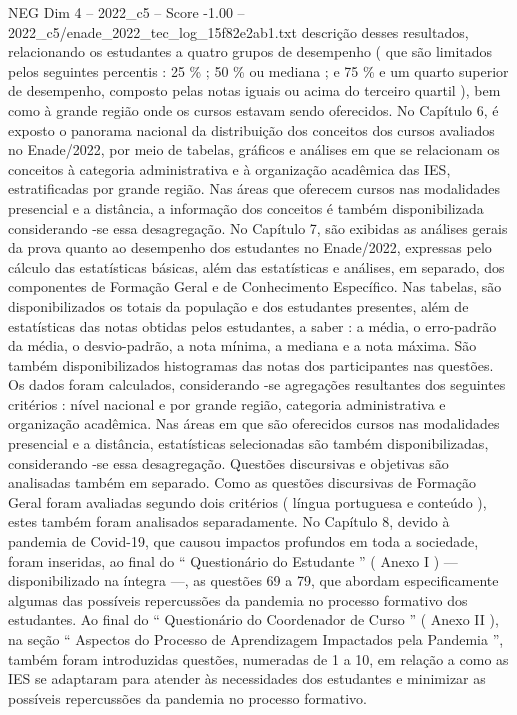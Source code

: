 \begin{textsample}{NEG Dim 4 – 2022\_c5 – Score -1.00 – 2022\_c5/enade\_2022\_tec\_log\_15f82e2ab1.txt}  \label{ex:f4_neg_079}
descrição desses resultados, relacionando os estudantes a quatro grupos de desempenho ( que são limitados pelos seguintes percentis : 25 \% ; 50 \% ou mediana ; e 75 \% e um quarto superior de desempenho, composto pelas notas iguais ou acima do terceiro quartil ), bem como à grande região onde os cursos estavam sendo oferecidos.
No Capítulo 6, é exposto o panorama nacional da distribuição dos conceitos dos cursos avaliados no Enade/2022, por meio de tabelas, gráficos e análises em que se relacionam os conceitos à categoria administrativa e à organização acadêmica das IES, estratificadas por grande região.
Nas áreas que oferecem cursos nas modalidades presencial e a distância, a informação dos conceitos é também disponibilizada considerando -se essa desagregação.
No Capítulo 7, são exibidas as análises gerais da prova quanto ao desempenho dos estudantes no Enade/2022, expressas pelo cálculo das estatísticas básicas, além das estatísticas e análises, em separado, dos componentes de Formação Geral e de Conhecimento Específico.
Nas tabelas, são disponibilizados os totais da população e dos estudantes presentes, além de estatísticas das notas obtidas pelos estudantes, a saber : a média, o erro-padrão da média, o desvio-padrão, a nota mínima, a mediana e a nota máxima.
São também disponibilizados histogramas das notas dos participantes nas questões.
Os dados foram calculados, considerando -se agregações resultantes dos seguintes critérios : nível nacional e por grande região, categoria administrativa e organização acadêmica.
Nas áreas em que são oferecidos cursos nas modalidades presencial e a distância, estatísticas selecionadas são também disponibilizadas, considerando -se essa desagregação.
Questões discursivas e objetivas são analisadas também em separado.
Como as questões discursivas de Formação Geral foram avaliadas segundo dois critérios ( língua portuguesa e conteúdo ), estes também foram analisados separadamente.
No Capítulo 8, devido à pandemia de Covid-19, que causou impactos profundos em toda a sociedade, foram inseridas, ao final do “ Questionário do Estudante ” ( Anexo I ) — disponibilizado na íntegra —, as questões 69 a 79, que abordam especificamente algumas das possíveis repercussões da pandemia no processo formativo dos estudantes.
Ao final do “ Questionário do Coordenador de Curso ” ( Anexo II ), na seção “ Aspectos do Processo de Aprendizagem Impactados pela Pandemia ”, também foram introduzidas questões, numeradas de 1 a 10, em relação a como as IES se adaptaram para atender às necessidades dos estudantes e minimizar as possíveis repercussões da pandemia no processo formativo.

\end{textsample}
